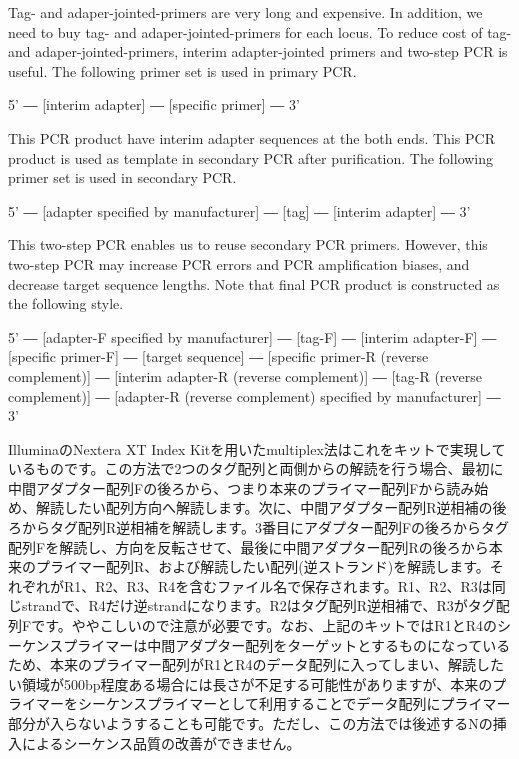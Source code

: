 \documentclass[titlepage,10pt,a4paper,english]{jsbook}
\newenvironment{pre}{\begin{leftbar}\raggedright\ttfamily\footnotesize\setlength{\baselineskip}{1.4em}}{\end{leftbar}\vspace{-1em}}
\begin{document}
Tag- and adaper-jointed-primers are very long and expensive. In addition, we need to buy tag- and adaper-jointed-primers for each locus. To reduce cost of tag- and adaper-jointed-primers, interim adapter-jointed primers and two-step PCR is useful. The following primer set is used in primary PCR.
\begin{pre}
5' ― [interim adapter] ― [specific primer] ― 3'
\end{pre}
This PCR product have interim adapter sequences at the both ends. This PCR product is used as template in secondary PCR after purification. The following primer set is used in secondary PCR.
\begin{pre}
5' ― [adapter specified by manufacturer] ― [tag] ― [interim adapter] ― 3'
\end{pre}
This two-step PCR enables us to reuse secondary PCR primers. However, this two-step PCR may increase PCR errors and PCR amplification biases, and decrease target sequence lengths. Note that final PCR product is constructed as the following style.
\begin{pre}
5' ― [adapter-F specified by manufacturer] ― [tag-F] ― [interim adapter-F] ― [specific primer-F] ― [target sequence] ― [specific primer-R (reverse complement)] ― [interim adapter-R (reverse complement)] ― [tag-R (reverse complement)] ― [adapter-R (reverse complement) specified by manufacturer] ― 3'
\end{pre}
IlluminaのNextera XT Index Kitを用いたmultiplex法\citep{Illumina2013}はこれをキットで実現しているものです。この方法で2つのタグ配列と両側からの解読を行う場合、最初に中間アダプター配列Fの後ろから、つまり本来のプライマー配列Fから読み始め、解読したい配列方向へ解読します。次に、中間アダプター配列R逆相補の後ろからタグ配列R逆相補を解読します。3番目にアダプター配列Fの後ろからタグ配列Fを解読し、方向を反転させて、最後に中間アダプター配列Rの後ろから本来のプライマー配列R、および解読したい配列(逆ストランド)を解読します。それぞれがR1、R2、R3、R4を含むファイル名で保存されます。R1、R2、R3は同じstrandで、R4だけ逆strandになります。R2はタグ配列R逆相補で、R3がタグ配列Fです。ややこしいので注意が必要です。なお、上記のキットではR1とR4のシーケンスプライマーは中間アダプター配列をターゲットとするものになっているため、本来のプライマー配列がR1とR4のデータ配列に入ってしまい、解読したい領域が500bp程度ある場合には長さが不足する可能性がありますが、本来のプライマーをシーケンスプライマーとして利用することでデータ配列にプライマー部分が入らないようすることも可能です。ただし、この方法では後述するNの挿入によるシーケンス品質の改善ができません。
\end{document}
